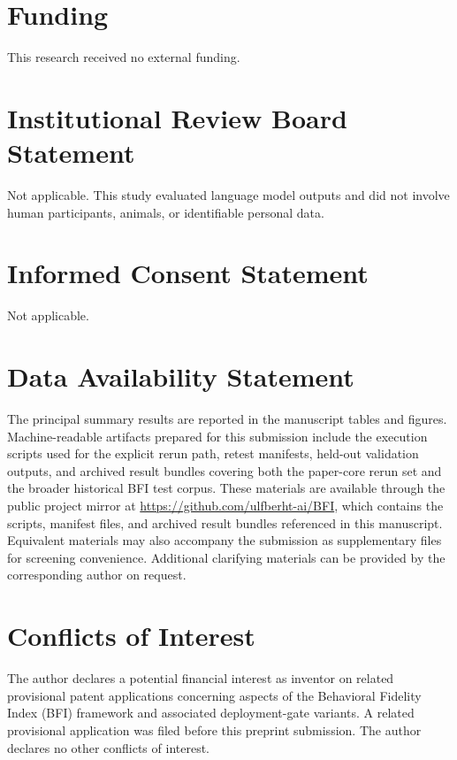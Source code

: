 \documentclass[11pt,a4paper]{article}
\begin{document}
\section*{Funding}

This research received no external funding.

\section*{Institutional Review Board Statement}

Not applicable. This study evaluated language model outputs and did not involve human participants, animals, or identifiable personal data.

\section*{Informed Consent Statement}

Not applicable.

\section*{Data Availability Statement}

The principal summary results are reported in the manuscript tables and figures. Machine-readable artifacts prepared for this submission include the execution scripts used for the explicit rerun path, retest manifests, held-out validation outputs, and archived result bundles covering both the paper-core rerun set and the broader historical BFI test corpus. These materials are available through the public project mirror at \url{https://github.com/ulfberht-ai/BFI}, which contains the scripts, manifest files, and archived result bundles referenced in this manuscript. Equivalent materials may also accompany the submission as supplementary files for screening convenience. Additional clarifying materials can be provided by the corresponding author on request.

\section*{Conflicts of Interest}

The author declares a potential financial interest as inventor on related provisional patent applications concerning aspects of the Behavioral Fidelity Index (BFI) framework and associated deployment-gate variants. A related provisional application was filed before this preprint submission. The author declares no other conflicts of interest.



\end{document}
